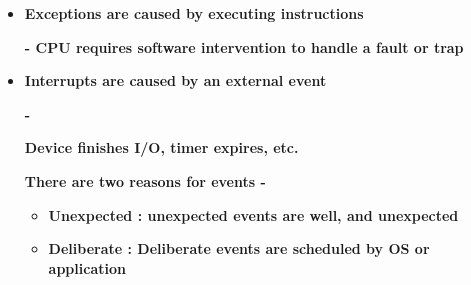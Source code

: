 \documentclass[12pt]{article}
\begin{document}
\begin{itemize}
\begin{adjustwidth}{0.75in}{0.0in}
\end{adjustwidth}

{\fontsize{16pt}{19.2pt}\selectfont \textbf{There are two kinds of events –}\par}\par

\begin{itemize}
	\item {\fontsize{16pt}{19.2pt}\selectfont \textbf{Interrupts}\par}\par

	\item {\fontsize{16pt}{19.2pt}\selectfont \textbf{Exceptions}\par}
\end{itemize}\par

	\item {\fontsize{16pt}{19.2pt}\selectfont \textbf{Exceptions are caused by executing instructions}\par}\par

{\fontsize{16pt}{19.2pt}\selectfont \textbf{- CPU requires software intervention to handle a fault or trap}\par}\par

	\item {\fontsize{16pt}{19.2pt}\selectfont \textbf{Interrupts are caused by an external event}\par}\par

{\fontsize{16pt}{19.2pt}\selectfont \textbf{-}\par} {\fontsize{16pt}{19.2pt}\selectfont \textbf{Device finishes I/O, timer expires, etc.}\par}\par


\vspace{\baselineskip}
{\fontsize{16pt}{19.2pt}\selectfont \textbf{There are two reasons for events -}\par}\par

\begin{itemize}
	\item {\fontsize{16pt}{19.2pt}\selectfont \textbf{Unexpected : unexpected events are well, and unexpected}\par}\par

	\item {\fontsize{16pt}{19.2pt}\selectfont \textbf{Deliberate : Deliberate events are scheduled by OS or application}\par}
\end{itemize}\par


\end{itemize}
\end{document}
